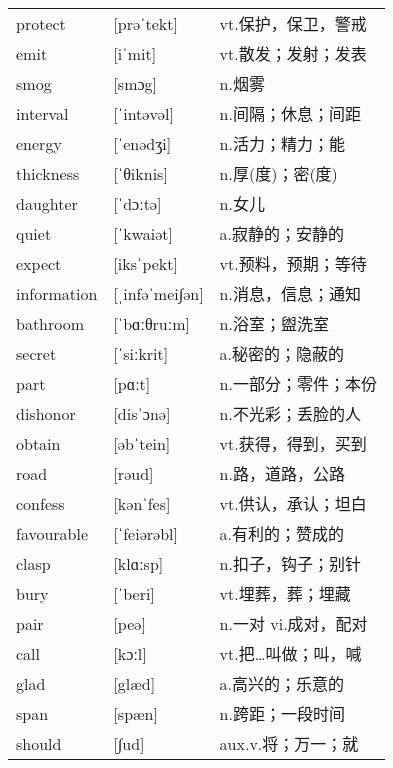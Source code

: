 \documentclass[a4paper]{article}
\begin{document}
\section{}
\begin{tabular}{l l l}

protect & [prəˈtekt] & vt.保护，保卫，警戒 \\
emit & [iˈmit] & vt.散发；发射；发表 \\
smog & [smɔg] & n.烟雾 \\
interval & [ˈintəvəl] & n.间隔；休息；间距 \\
energy & [ˈenədʒi] & n.活力；精力；能 \\
thickness & [ˈθiknis] & n.厚(度)；密(度) \\
daughter & [ˈdɔːtə] & n.女儿 \\
quiet & [ˈkwaiət] & a.寂静的；安静的 \\
expect & [iksˈpekt] & vt.预料，预期；等待 \\
information & [ˌinfəˈmei∫ən] & n.消息，信息；通知 \\
bathroom & [ˈbɑːθruːm] & n.浴室；盥洗室 \\
secret & [ˈsiːkrit] & a.秘密的；隐蔽的 \\
part & [pɑːt] & n.一部分；零件；本份 \\
dishonor & [disˈɔnə] & n.不光彩；丢脸的人 \\
obtain & [əbˈtein] & vt.获得，得到，买到 \\
road & [rəud] & n.路，道路，公路 \\
confess & [kənˈfes] & vt.供认，承认；坦白 \\
favourable & [ˈfeiərəbl] & a.有利的；赞成的 \\
clasp & [klɑːsp] & n.扣子，钩子；别针 \\
bury & [ˈberi] & vt.埋葬，葬；埋藏 \\
pair & [peə] & n.一对 vi.成对，配对 \\
call & [kɔːl] & vt.把…叫做；叫，喊 \\
glad & [glæd] & a.高兴的；乐意的 \\
span & [spæn] & n.跨距；一段时间 \\
should & [∫ud] & aux.v.将；万一；就 \\

\end{tabular}
\end{document}
